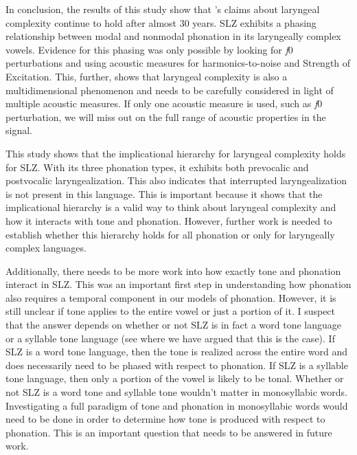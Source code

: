 In conclusion, the results of this study show that \citeauthor{silvermanLaryngealComplexityOtomanguean1997}'s \citeyear{silvermanLaryngealComplexityOtomanguean1997} claims about laryngeal complexity continue to hold after almost 30 years. SLZ exhibits a phasing relationship between modal and nonmodal phonation in its laryngeally complex vowels. Evidence for this phasing was only possible by looking for \textit{f}0 perturbations and using acoustic measures for harmonics-to-noise and Strength of Excitation. This, further, shows that laryngeal complexity is also a multidimensional phenomenon and needs to be carefully considered in light of multiple acoustic measures. If only one acoustic measure is used, such as \textit{f}0 perturbation, we will miss out on the full range of acoustic properties in the signal. 

This study shows that the implicational hierarchy for laryngeal complexity holds for SLZ. With its three phonation types, it exhibits both prevocalic and postvocalic laryngealization. This also indicates that interrupted laryngealization is not present in this language. This is important because it shows that the implicational hierarchy is a valid way to think about laryngeal complexity and how it interacts with tone and phonation. However, further work is needed to establish whether this hierarchy holds for all phonation or only for laryngeally complex languages. 

Additionally, there needs to be more work into how exactly tone and phonation interact in SLZ. This was an important first step in understanding how phonation also requires a temporal component in our models of phonation. However, it is still unclear if tone applies to the entire vowel or just a portion of it. I suspect that the answer depends on whether or not SLZ is in fact a word tone language or a syllable tone language (see \cite{brinkerhoffTonalPatternsTheir2022} where we have argued that this is the case). If SLZ is a word tone language, then the tone is realized across the entire word and does necessarily need to be phased with respect to phonation. If SLZ is a syllable tone language, then only a portion of the vowel is likely to be tonal. Whether or not SLZ is a word tone and syllable tone wouldn't matter in monosyllabic words. Investigating a full paradigm of tone and phonation in monosyllabic words would need to be done in order to determine how tone is produced with respect to phonation. This is an important question that needs to be answered in future work.

